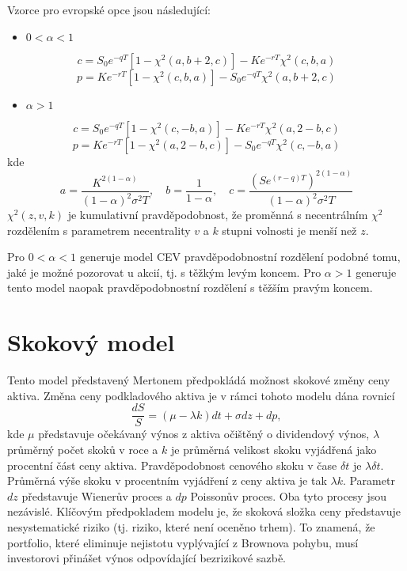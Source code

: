 \documentclass[a4paper]{book}
\begin{document}
Vzorce pro evropské opce jsou následující:

\begin{itemize}
\item $0 < \alpha < 1$
\end{itemize}
\begin{equation*}
c = S_0 e^{-qT}[1-\chi^2(a,b+2,c)]-Ke^{-rT}\chi^2(c,b,a)
\end{equation*}
\begin{equation*}
p = Ke^{-rT}[1-\chi^2(c,b,a)]-S_0e^{-qT}\chi^2(a,b+2,c)
\end{equation*}
\begin{itemize}
\item $\alpha > 1$
\end{itemize}
\begin{equation*}
c = S_0 e^{-qT}[1-\chi^2(c,-b,a)]-Ke^{-rT}\chi^2(a,2-b,c)
\end{equation*}
\begin{equation*}
p = Ke^{-rT}[1-\chi^2(a,2-b,c)]-S_0e^{-qT}\chi^2(c,-b,a)
\end{equation*}
kde
\begin{equation*}
a = \frac{K^{2(1-\alpha)}}{(1-\alpha)^2\sigma^2T}, \quad b = \frac{1}{1-\alpha}, \quad c = \frac{(Se^{(r-q)T})^{2(1-\alpha)}}{(1-\alpha)^2\sigma^2T}
\end{equation*}
$\chi^2(z,v,k)$ je kumulativní pravděpodobnost, že proměnná s necentrálním $\chi^2$ rozdělením s parametrem necentrality $v$ a $k$ stupni volnosti je menší než $z$.

Pro $0 < \alpha < 1$ generuje model CEV pravděpodobnostní rozdělení podobné tomu, jaké je možné pozorovat u akcií, tj. s těžkým levým koncem. Pro $\alpha > 1$ generuje tento model naopak pravděpodobnostní rozdělení s těžším pravým koncem.

\section{Skokový model}

Tento model představený Mertonem předpokládá možnost skokové změny ceny aktiva. Změna ceny podkladového aktiva je v rámci tohoto modelu dána rovnicí
\begin{equation*}
\frac{d S}{S} = (\mu - \lambda k)dt + \sigma dz + dp,
\end{equation*}
kde $\mu$ představuje očekávaný výnos z aktiva očištěný o dividendový výnos, $\lambda$ průměrný počet skoků v roce a $k$ je průměrná velikost skoku vyjádřená jako procentní část ceny aktiva. Pravděpodobnost cenového skoku v čase $\delta t$ je $\lambda \delta t$. Průměrná výše skoku v procentním vyjádření z ceny aktiva je tak $\lambda k$. Parametr $dz$ představuje Wienerův proces a $dp$ Poissonův proces. Oba tyto procesy jsou nezávislé. Klíčovým předpokladem modelu je, že skoková složka ceny představuje nesystematické riziko (tj. riziko, které není oceněno trhem). To znamená, že portfolio, které eliminuje nejistotu vyplývající z Brownova pohybu, musí investorovi přinášet výnos odpovídající bezrizikové sazbě.
\end{document}
